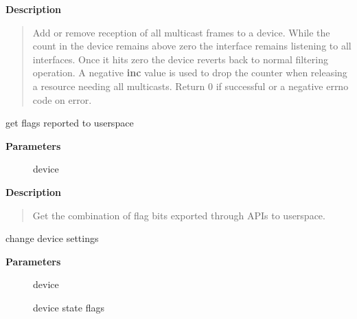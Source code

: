 \documentclass[a4paper,8pt,english]{sphinxmanual}
\begin{document}
\textbf{Description}
\begin{quote}

Add or remove reception of all multicast frames to a device. While the
count in the device remains above zero the interface remains listening
to all interfaces. Once it hits zero the device reverts back to normal
filtering operation. A negative \textbf{inc} value is used to drop the counter
when releasing a resource needing all multicasts.
Return 0 if successful or a negative errno code on error.
\end{quote}

\begin{fulllineitems}
\label{networking/kapi:c.dev_get_flags}
get flags reported to userspace

\end{fulllineitems}


\textbf{Parameters}
\begin{description}
\item[{}] \leavevmode
device

\end{description}

\textbf{Description}
\begin{quote}

Get the combination of flag bits exported through APIs to userspace.
\end{quote}

\begin{fulllineitems}
\label{networking/kapi:c.dev_change_flags}
change device settings

\end{fulllineitems}


\textbf{Parameters}
\begin{description}
\item[{}] \leavevmode
device

\item[{}] \leavevmode
device state flags

\end{description}
\end{document}
